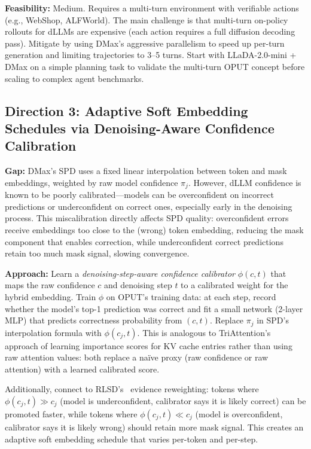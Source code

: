 \documentclass[11pt]{article}
\begin{document}
\textbf{Feasibility:} Medium. Requires a multi-turn environment with verifiable actions (e.g., WebShop, ALFWorld). The main challenge is that multi-turn on-policy rollouts for dLLMs are expensive (each action requires a full diffusion decoding pass). Mitigate by using DMax's aggressive parallelism to speed up per-turn generation and limiting trajectories to 3--5 turns. Start with LLaDA-2.0-mini + DMax on a simple planning task to validate the multi-turn OPUT concept before scaling to complex agent benchmarks.

\subsection{Direction 3: Adaptive Soft Embedding Schedules via Denoising-Aware Confidence Calibration}

\textbf{Gap:} DMax's SPD uses a fixed linear interpolation between token and mask embeddings, weighted by raw model confidence $\pi_j$. However, dLLM confidence is known to be poorly calibrated---models can be overconfident on incorrect predictions or underconfident on correct ones, especially early in the denoising process. This miscalibration directly affects SPD quality: overconfident errors receive embeddings too close to the (wrong) token embedding, reducing the mask component that enables correction, while underconfident correct predictions retain too much mask signal, slowing convergence.

\textbf{Approach:} Learn a \textit{denoising-step-aware confidence calibrator} $\phi(c, t)$ that maps the raw confidence $c$ and denoising step $t$ to a calibrated weight for the hybrid embedding. Train $\phi$ on OPUT's training data: at each step, record whether the model's top-1 prediction was correct and fit a small network (2-layer MLP) that predicts correctness probability from $(c, t)$. Replace $\pi_j$ in SPD's interpolation formula with $\phi(c_j, t)$. This is analogous to TriAttention's~\cite{triattention} approach of learning importance scores for KV cache entries rather than using raw attention values: both replace a na\"ive proxy (raw confidence or raw attention) with a learned calibrated score.

Additionally, connect to RLSD's~\cite{rlsd} evidence reweighting: tokens where $\phi(c_j, t) \gg c_j$ (model is underconfident, calibrator says it is likely correct) can be promoted faster, while tokens where $\phi(c_j, t) \ll c_j$ (model is overconfident, calibrator says it is likely wrong) should retain more mask signal. This creates an adaptive soft embedding schedule that varies per-token and per-step.
\end{document}
